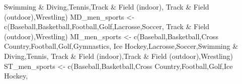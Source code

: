 \documentclass[
]{article}
\newenvironment{Shaded}{\begin{snugshade}}{\end{snugshade}}
\newcommand{\FunctionTok}[1]{\textcolor[rgb]{0.00,0.00,0.00}{#1}}
\newcommand{\NormalTok}[1]{#1}
\newcommand{\OtherTok}[1]{\textcolor[rgb]{0.56,0.35,0.01}{#1}}
\newcommand{\StringTok}[1]{\textcolor[rgb]{0.31,0.60,0.02}{#1}}
\begin{document}
\begin{Shaded}
\begin{Highlighting}[]
                   \StringTok{\textquotesingle{}Swimming \& Diving\textquotesingle{}}\NormalTok{,}\StringTok{\textquotesingle{}Tennis\textquotesingle{}}\NormalTok{,}\StringTok{\textquotesingle{}Track \& Field (indoor)\textquotesingle{}}\NormalTok{,}
                   \StringTok{\textquotesingle{}Track \& Field (outdoor)\textquotesingle{}}\NormalTok{,}\StringTok{\textquotesingle{}Wrestling\textquotesingle{}}\NormalTok{)}
\NormalTok{MD\_men\_sports }\OtherTok{\textless{}{-}} \FunctionTok{c}\NormalTok{(}\StringTok{\textquotesingle{}Baseball\textquotesingle{}}\NormalTok{,}\StringTok{\textquotesingle{}Basketball\textquotesingle{}}\NormalTok{,}\StringTok{\textquotesingle{}Football\textquotesingle{}}\NormalTok{,}\StringTok{\textquotesingle{}Golf\textquotesingle{}}\NormalTok{,}\StringTok{\textquotesingle{}Lacrosse\textquotesingle{}}\NormalTok{,}\StringTok{\textquotesingle{}Soccer\textquotesingle{}}\NormalTok{,}
                   \StringTok{\textquotesingle{}Track \& Field (outdoor)\textquotesingle{}}\NormalTok{,}\StringTok{\textquotesingle{}Wrestling\textquotesingle{}}\NormalTok{)}
\NormalTok{MI\_men\_sports }\OtherTok{\textless{}{-}} \FunctionTok{c}\NormalTok{(}\StringTok{\textquotesingle{}Baseball\textquotesingle{}}\NormalTok{,}\StringTok{\textquotesingle{}Basketball\textquotesingle{}}\NormalTok{,}\StringTok{\textquotesingle{}Cross Country\textquotesingle{}}\NormalTok{,}\StringTok{\textquotesingle{}Football\textquotesingle{}}\NormalTok{,}\StringTok{\textquotesingle{}Golf\textquotesingle{}}\NormalTok{,}\StringTok{\textquotesingle{}Gymnastics\textquotesingle{}}\NormalTok{,}
                   \StringTok{\textquotesingle{}Ice Hockey\textquotesingle{}}\NormalTok{,}\StringTok{\textquotesingle{}Lacrosse\textquotesingle{}}\NormalTok{,}\StringTok{\textquotesingle{}Soccer\textquotesingle{}}\NormalTok{,}\StringTok{\textquotesingle{}Swimming \& Diving\textquotesingle{}}\NormalTok{,}\StringTok{\textquotesingle{}Tennis\textquotesingle{}}\NormalTok{,}
                   \StringTok{\textquotesingle{}Track \& Field (indoor)\textquotesingle{}}\NormalTok{,}\StringTok{\textquotesingle{}Track \& Field (outdoor)\textquotesingle{}}\NormalTok{,}\StringTok{\textquotesingle{}Wrestling\textquotesingle{}}\NormalTok{)}
\NormalTok{ST\_men\_sports }\OtherTok{\textless{}{-}} \FunctionTok{c}\NormalTok{(}\StringTok{\textquotesingle{}Baseball\textquotesingle{}}\NormalTok{,}\StringTok{\textquotesingle{}Basketball\textquotesingle{}}\NormalTok{,}\StringTok{\textquotesingle{}Cross Country\textquotesingle{}}\NormalTok{,}\StringTok{\textquotesingle{}Football\textquotesingle{}}\NormalTok{,}\StringTok{\textquotesingle{}Golf\textquotesingle{}}\NormalTok{,}\StringTok{\textquotesingle{}Ice Hockey\textquotesingle{}}\NormalTok{,}

\end{Highlighting}
\end{Shaded}
\end{document}
